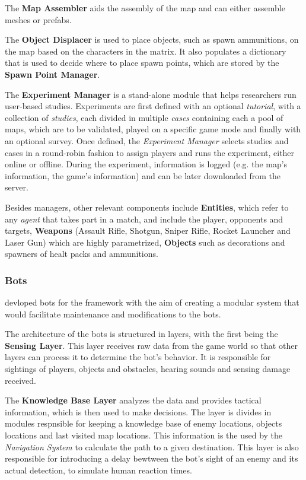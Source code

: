 \documentclass{Configuration_Files/PoliMi3i_thesis}
\begin{document}
The \textbf{Map Assembler} aids the assembly of the map and can either assemble meshes or prefabs.

The \textbf{Object Displacer} is used to place objects, such as spawn ammunitions, on the map based on the characters in the matrix. It also populates a dictionary that is used to decide where to place spawn points, which are stored by the \textbf{Spawn Point Manager}.

The \textbf{Experiment Manager} is a stand-alone module that helps researchers run user-based studies. Experiments are first defined with an optional \textit{tutorial}, with a collection of \textit{studies}, each divided in multiple \textit{cases} containing each a pool of maps, which are to be validated, played on a specific game mode and finally with an optional survey. Once defined, the \textit{Experiment Manager} selects studies and cases in a round-robin fashion to assign players and runs the experiment, either online or offline. During the experiment, information is logged (e.g. the map's information, the game's information) and can be later downloaded from the server.

Besides managers, other relevant components include \textbf{Entities}, which refer to any \textit{agent} that takes part in a match, and include the player, opponents and targets, \textbf{Weapons} (Assault Rifle, Shotgun, Sniper Rifle, Rocket Launcher and Laser Gun) which are highly parametrized, \textbf{Objects} such as decorations and spawners of healt packs and ammunitions. 

\subsubsection{Bots}
\label{subsec:bots}

\citeauthor{bari_evolutionary-based_2023} devloped bots for the framework with the aim of creating a modular system that would facilitate maintenance and modifications to the bots. \cite{bari_evolutionary-based_2023}

The architecture of the bots is structured in layers, with the first being the \textbf{Sensing Layer}. This layer receives raw data from the game world so that other layers can process it to determine the bot's behavior. It is responsible for sightings of players, objects and obstacles, hearing sounds and sensing damage received.

The \textbf{Knowledge Base Layer} analyzes the data and provides tactical information, which is then used to make decisions. The layer is divides in modules respnsible for keeping a knowledge base of enemy locations, objects locations and last visited map locations. This information is the used by the \textit{Navigation System} to calculate the path to a given destination. This layer is also responsible for introducing a delay bewtween the bot's sight of an enemy and its actual detection, to simulate human reaction times.
\end{document}
